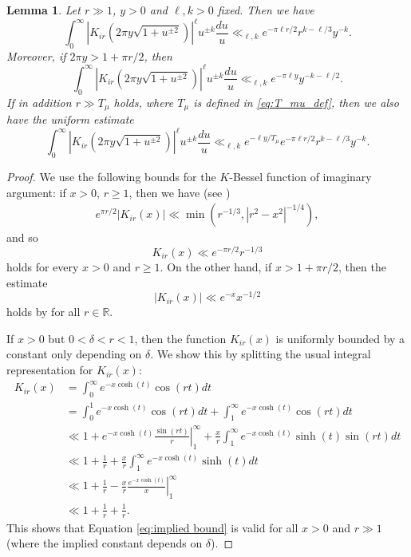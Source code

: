 \documentclass[11pt, oneside]{amsart}
\theoremstyle{plain}
\newtheorem{lemma}[theorem]{Lemma}
\theoremstyle{remark}
\newcommand{\R}{\mathbb{R}}
\newcommand{\abs}[1]{\left|#1\right|}
\begin{document}
\begin{lemma}\label{lem bound integral of Bessel function}
Let $r\gg1$, $y>0$ and $\ell,k>0$ fixed.
Then we have
$$\int_0^\infty\abs{K_{ir}(2\pi y\sqrt{1+u^{\pm 2}})}^\ell u^{\pm k}\frac{du}u\ll_{\ell,k}e^{-\pi\ell r/2}r^{k-\ell/3}y^{-k}.$$
Moreover, if $2\pi y>1+\pi r/2$, then
$$\int_0^\infty\abs{K_{ir}(2\pi y\sqrt{1+u^{\pm 2}})}^\ell u^{\pm k}\frac{du}u\ll_{\ell,k}e^{-\pi\ell y}y^{-k-\ell/2}.$$
If in addition $r\gg T_\mu$ holds, where $T_\mu$ is defined in \eqref{eq:T_mu_def},
then we also have the uniform estimate
$$\int_0^\infty\abs{K_{ir}(2\pi y\sqrt{1+u^{\pm 2}})}^\ell u^{\pm k}\frac{du}u\ll_{\ell,k}e^{-\ell y/T_\mu}e^{-\pi\ell r/2}r^{k-\ell/3}y^{-k}.$$
\end{lemma}

\begin{proof}
We use the following bounds for the $K$-Bessel function 
of imaginary argument:
if $x>0$, $r\geq 1$, then we have (see \cite[p.\ 679]{BH09})
\begin{align*}
e^{\pi r/2}\abs{K_{ir}(x)}\ll 
\min(r^{-1/3},
    \abs{r^2-x^2}^{-1/4}),
\end{align*}
and so
\begin{equation}\label{eq:implied bound}
K_{ir}(x)\ll e^{-\pi r/2}r^{-1/3}
\end{equation}
holds for every $x>0$ and $r\geq1$. On the other hand, if
$x>1+\pi r/2$, then the estimate
\begin{equation}\label{eq bounds K Bessel 2}
\abs{K_{ir}(x)}\ll e^{-x}x^{-1/2}
\end{equation}
holds  by \cite[Proposition 9]{HM06} for all $r\in\R$.

If $x>0$ but $0<\delta<r<1$, then the function $K_{ir}(x)$ is uniformly bounded by a constant only depending on 
$\delta$.
We show this by splitting the usual integral representation for $K_{ir}(x)$:
\begin{align*}
K_{ir}(x)&=\int_0^\infty e^{-x\cosh(t)}\cos(rt)dt\\
    &=\int_0^1e^{-x\cosh(t)}\cos(rt)dt+\int_1^\infty e^{-x\cosh(t)}\cos(rt)dt\\
    &\ll1+\left.e^{-x\cosh(t)}\frac{\sin(rt)}r\right|_1^\infty+\frac xr\int_1^\infty e^{-x\cosh(t)}\sinh(t)\sin(rt)dt\\
    &\ll1+\frac1r+\frac xr\int_1^\infty e^{-x\cosh(t)}\sinh(t)dt\\
    &\ll1+\frac1r-\left.\frac xr\frac{e^{-x\cosh(t)}}x\right|_1^\infty\\
    &\ll1+\frac1r+\frac1r.
\end{align*}
This shows that Equation \eqref{eq:implied bound} is valid for all $x>0$ and $r\gg1$
(where the implied constant depends on $\delta$).


\end{proof}
\end{document}
